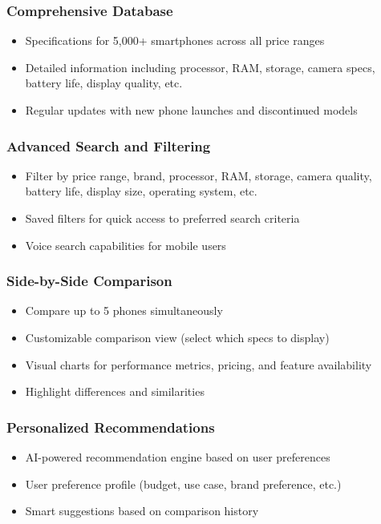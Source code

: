 \documentclass[12pt]{article}
\begin{document}
\subsubsection{Comprehensive Database}
\begin{itemize}
    \item Specifications for 5,000+ smartphones across all price ranges
    \item Detailed information including processor, RAM, storage, camera specs, battery life, display quality, etc.
    \item Regular updates with new phone launches and discontinued models
\end{itemize}

\subsubsection{Advanced Search and Filtering}
\begin{itemize}
    \item Filter by price range, brand, processor, RAM, storage, camera quality, battery life, display size, operating system, etc.
    \item Saved filters for quick access to preferred search criteria
    \item Voice search capabilities for mobile users
\end{itemize}

\subsubsection{Side-by-Side Comparison}
\begin{itemize}
    \item Compare up to 5 phones simultaneously
    \item Customizable comparison view (select which specs to display)
    \item Visual charts for performance metrics, pricing, and feature availability
    \item Highlight differences and similarities
\end{itemize}

\subsubsection{Personalized Recommendations}
\begin{itemize}
    \item AI-powered recommendation engine based on user preferences
    \item User preference profile (budget, use case, brand preference, etc.)
    \item Smart suggestions based on comparison history
\end{itemize}
\end{document}
